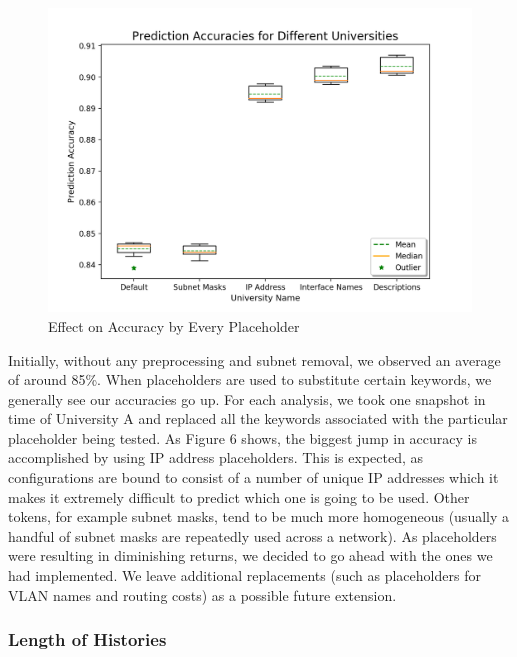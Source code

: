 \begin{figure}[H]
	\centering
	\includegraphics[width=\textwidth]{placeholders.png}
	\caption{Effect on Accuracy by Every Placeholder}
\end{figure}

Initially, without any preprocessing and subnet removal, we observed an average of around 85\%. When placeholders are used to substitute certain keywords, we generally see our accuracies go up.
For each analysis, we took one snapshot in time of University A and replaced all the keywords associated with the particular placeholder being tested. As Figure 6 shows, the biggest jump in accuracy is accomplished by using IP address placeholders. This is expected, as configurations are bound to consist of a number of unique IP addresses which it makes it extremely difficult to predict which one is going to be used. Other tokens, for example subnet masks, tend to be much more homogeneous (usually a handful of subnet masks are repeatedly used across a network). As placeholders were resulting in diminishing returns, we decided to go ahead with the ones we had implemented. We leave additional replacements (such as placeholders for VLAN names and routing costs) as a possible future extension.

\subsubsection{Length of Histories}

